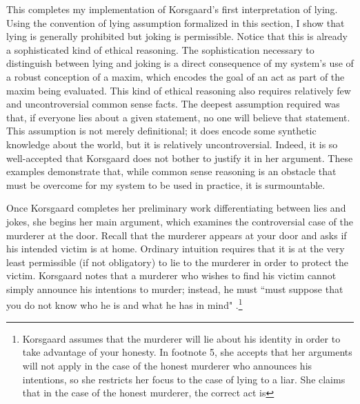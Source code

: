 \begin{isabellebody}
\endisatagproof
{\isafoldproof}%
%
\isadelimproof
%
\endisadelimproof
%
\begin{isamarkuptext}%
This completes my implementation of Korsgaard's first interpretation of lying. Using the convention
of lying assumption formalized in this section, I show that lying is generally prohibited but joking
is permissible. Notice that this is already a sophisticated kind of ethical reasoning. The sophistication
necessary to distinguish between lying and joking is a direct consequence of my system's use of a robust
conception of a maxim, which encodes the goal of an act as part of the maxim being evaluated. This kind 
of ethical reasoning also requires relatively few and uncontroversial common sense facts. The deepest
assumption required was that, if everyone lies about a given statement, no one will believe that 
statement. This assumption is not merely definitional; it does encode some synthetic knowledge about the 
world, but it is relatively uncontroversial. Indeed, it is so well-accepted that Korsgaard does not 
bother to justify it in her argument. These examples demonstrate that, while common sense reasoning 
is an obstacle that must be overcome for my system to be used in practice, it is surmountable.%
\end{isamarkuptext}\isamarkuptrue%
%
\isadelimdocument
%
\endisadelimdocument
%
\isatagdocument
%
\isamarkuptrue%
%
\endisatagdocument
{\isafolddocument}%
%
\isadelimdocument
%
\endisadelimdocument
%
\begin{isamarkuptext}%
Once Korsgaard completes her preliminary work differentiating between lies and jokes, she begins her main
 argument, which examines the controversial case of the murderer at the door. Recall that the murderer
appears at your door and asks if his intended victim is at home. Ordinary intuition requires that it 
is at the very least permissible (if not obligatory) to lie to the murderer in order to protect the 
victim. Korsgaard notes that a murderer who wishes to find his victim cannot simply announce his
intentions to murder; instead, he must ``must suppose that you do not know who he is and
what he has in mind" \citep[5]{KorsgaardRTL}.\footnote{Korsgaard assumes that the murderer will lie 
about his identity in order to take advantage of your honesty. In footnote 5, she accepts that her 
arguments will not apply in the case of the honest murderer who announces his intentions, so she 
restricts her focus to the case of lying to a liar. She claims that in the case of the honest murderer, the correct act is 
}
\end{isamarkuptext}
\end{isabellebody}
